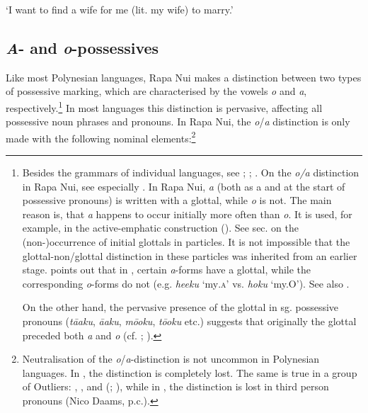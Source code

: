\glt 
‘I want to find a wife for me (lit. my wife) to marry.’ \textstyleExampleref{[R491.005]} 
\z

\subsection{\textit{A}{}- and \textit{o}{}-possessives}\label{sec:6.3.2}
Like most Polynesian languages, Rapa Nui makes a distinction between two types of possessive marking, which are characterised by the vowels \textit{o} and \textit{a}, respectively.\footnote{\label{fn:292}Besides the grammars of individual languages, see \citet[42-44]{Clark1976}; \citet{Capell1931}; \citet{Biggs2000}. On the \textit{o/a} distinction in Rapa Nui, see especially \citet{MulloyRapu1977}.
In Rapa Nui, \textit{{\ꞌ}a} (both as a  and at the start of possessive pronouns) is written with a glottal, while \textit{o} is not. The main reason is, that \textit{{\ꞌ}a} happens to occur initially more often than \textit{o}. It is used, for example, in the active-emphatic construction (). See sec.  on the (non\nobreakdash-)occurrence of initial glottals in particles. It is not impossible that the glottal-non/glottal distinction in these particles was inherited from an earlier stage. \citet[259]{Clark2000Possessive} points out that in , certain \textit{a}{}-forms have a glottal, while the corresponding \textit{o}{}-forms do not (e.g. \textit{\mbox{he{\ꞌ}eku}} ‘my\textsc{.a}’ vs. \textit{hoku} ‘my.O’). See also \citet[48]{Wilson1982}.

On the other hand, the pervasive presence of the glottal in sg. possessive pronouns (\mbox{\textit{tā{\ꞌ}aku}}, \mbox{\textit{{\ꞌ}ā{\ꞌ}aku}}, \mbox{\textit{mō{\ꞌ}oku}}, \textit{tō{\ꞌ}oku} etc.) suggests that originally the glottal preceded both \textit{a} and \textit{o} (cf. \citealt[232]{Lynch1997}; \citealt[50]{Wilson1982}).} In most languages this distinction is pervasive, affecting all possessive noun phrases and pronouns. In Rapa Nui, the \textit{o}/\textit{a} distinction is only made with the following nominal elements:\footnote{\label{fn:293}Neutralisation of the \textit{o}/\textit{a}{}-distinction is not uncommon in Polynesian languages. In  \citep[34]{Seiter1980}, the distinction is completely lost. The same is true in a group of Outliers: , ,  and  (\citealt[11]{Wilson1982}; \citealt[267]{Clark2000Possessive}), while in , the distinction is lost in third person pronouns (Nico Daams, p.c.).}

